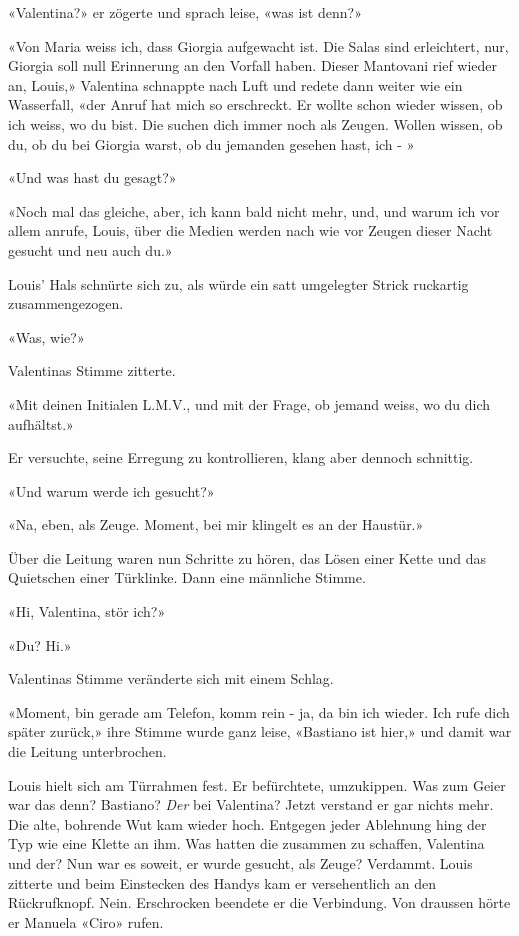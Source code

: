 «Valentina?» er zögerte und sprach leise, «was ist denn?»

«Von Maria weiss ich, dass Giorgia aufgewacht ist. Die Salas sind
erleichtert, nur, Giorgia soll null Erinnerung an den Vorfall haben.
Dieser Mantovani rief wieder an, Louis,» Valentina schnappte nach Luft
und redete dann weiter wie ein Wasserfall, «der Anruf hat mich so
erschreckt. Er wollte schon wieder wissen, ob ich weiss, wo du bist. Die
suchen dich immer noch als Zeugen. Wollen wissen, ob du, ob du bei
Giorgia warst, ob du jemanden gesehen hast, ich - »

«Und was hast du gesagt?»

«Noch mal das gleiche, aber, ich kann bald nicht mehr, und, und warum
ich vor allem anrufe, Louis, über die Medien werden nach wie vor Zeugen
dieser Nacht gesucht und neu auch du.»

Louis’ Hals schnürte sich zu, als würde ein satt umgelegter Strick
ruckartig zusammengezogen.

«Was, wie?»

Valentinas Stimme zitterte.

«Mit deinen Initialen L.M.V., und mit der Frage, ob jemand
weiss, wo du dich aufhältst.»

Er versuchte, seine Erregung zu kontrollieren, klang aber dennoch
schnittig.

«Und warum werde ich gesucht?»

«Na, eben, als Zeuge. Moment, bei mir klingelt es an der Haustür.»

Über die Leitung waren nun Schritte zu hören, das Lösen einer Kette und
das Quietschen einer Türklinke. Dann eine männliche Stimme.

«Hi, Valentina, stör ich?»

«Du? Hi.»

Valentinas Stimme veränderte sich mit einem Schlag.

«Moment, bin gerade am Telefon, komm rein - ja, da bin ich wieder. Ich
rufe dich später zurück,» ihre Stimme wurde ganz leise, «Bastiano ist
hier,» und damit war die Leitung unterbrochen. 

Louis hielt sich am Türrahmen fest. Er befürchtete, umzukippen. Was zum Geier
war das denn? Bastiano? \emph{Der} bei Valentina? Jetzt verstand er gar
nichts mehr. Die alte, bohrende Wut kam wieder hoch. Entgegen jeder
Ablehnung hing der Typ wie eine Klette an ihm. Was hatten die zusammen
zu schaffen, Valentina und der? Nun war es soweit, er wurde gesucht, als
Zeuge? Verdammt. Louis zitterte und beim Einstecken des Handys kam er versehentlich an
den Rückrufknopf. Nein. Erschrocken beendete er die Verbindung.
Von draussen hörte er Manuela «Ciro» rufen.
